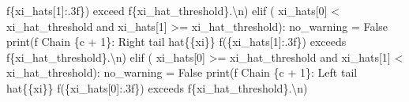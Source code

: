 \documentclass[
  letterpaper,
  DIV=11,
  numbers=noendperiod]{scrartcl}
\newenvironment{Shaded}{\begin{snugshade}}{\end{snugshade}}
\newcommand{\BuiltInTok}[1]{\textcolor[rgb]{0.00,0.23,0.31}{#1}}
\newcommand{\CharTok}[1]{\textcolor[rgb]{0.13,0.47,0.30}{#1}}
\newcommand{\ControlFlowTok}[1]{\textcolor[rgb]{0.00,0.23,0.31}{#1}}
\newcommand{\DecValTok}[1]{\textcolor[rgb]{0.68,0.00,0.00}{#1}}
\newcommand{\KeywordTok}[1]{\textcolor[rgb]{0.00,0.23,0.31}{#1}}
\newcommand{\NormalTok}[1]{\textcolor[rgb]{0.00,0.23,0.31}{#1}}
\newcommand{\OperatorTok}[1]{\textcolor[rgb]{0.37,0.37,0.37}{#1}}
\newcommand{\SpecialCharTok}[1]{\textcolor[rgb]{0.37,0.37,0.37}{#1}}
\newcommand{\SpecialStringTok}[1]{\textcolor[rgb]{0.13,0.47,0.30}{#1}}
\newcommand{\VariableTok}[1]{\textcolor[rgb]{0.07,0.07,0.07}{#1}}
\begin{document}
\begin{Shaded}
\begin{Highlighting}[]
            \SpecialStringTok{f\textquotesingle{}}\SpecialCharTok{\{}\NormalTok{xi\_hats[}\DecValTok{1}\NormalTok{]}\SpecialCharTok{:.3f\}}\SpecialStringTok{) exceed \textquotesingle{}}
            \SpecialStringTok{f\textquotesingle{}}\SpecialCharTok{\{}\NormalTok{xi\_hat\_threshold}\SpecialCharTok{\}}\SpecialStringTok{.}\CharTok{\textbackslash{}n}\SpecialStringTok{\textquotesingle{}}\NormalTok{)}
    \ControlFlowTok{elif}\NormalTok{ (    xi\_hats[}\DecValTok{0}\NormalTok{] }\OperatorTok{\textless{}}\NormalTok{ xi\_hat\_threshold}
          \KeywordTok{and}\NormalTok{ xi\_hats[}\DecValTok{1}\NormalTok{] }\OperatorTok{\textgreater{}=}\NormalTok{ xi\_hat\_threshold):}
\NormalTok{      no\_warning }\OperatorTok{=} \VariableTok{False}
      \BuiltInTok{print}\NormalTok{(}\SpecialStringTok{f\textquotesingle{}  Chain }\SpecialCharTok{\{}\NormalTok{c }\OperatorTok{+} \DecValTok{1}\SpecialCharTok{\}}\SpecialStringTok{: Right tail hat}\CharTok{\{\{}\SpecialStringTok{xi}\CharTok{\}\}}\SpecialStringTok{ \textquotesingle{}}
            \SpecialStringTok{f\textquotesingle{}(}\SpecialCharTok{\{}\NormalTok{xi\_hats[}\DecValTok{1}\NormalTok{]}\SpecialCharTok{:.3f\}}\SpecialStringTok{) exceeds \textquotesingle{}}
            \SpecialStringTok{f\textquotesingle{}}\SpecialCharTok{\{}\NormalTok{xi\_hat\_threshold}\SpecialCharTok{\}}\SpecialStringTok{.}\CharTok{\textbackslash{}n}\SpecialStringTok{\textquotesingle{}}\NormalTok{)}
    \ControlFlowTok{elif}\NormalTok{ (    xi\_hats[}\DecValTok{0}\NormalTok{] }\OperatorTok{\textgreater{}=}\NormalTok{ xi\_hat\_threshold}
          \KeywordTok{and}\NormalTok{ xi\_hats[}\DecValTok{1}\NormalTok{] }\OperatorTok{\textless{}}\NormalTok{ xi\_hat\_threshold):}
\NormalTok{      no\_warning }\OperatorTok{=} \VariableTok{False}
      \BuiltInTok{print}\NormalTok{(}\SpecialStringTok{f\textquotesingle{}  Chain }\SpecialCharTok{\{}\NormalTok{c }\OperatorTok{+} \DecValTok{1}\SpecialCharTok{\}}\SpecialStringTok{: Left tail hat}\CharTok{\{\{}\SpecialStringTok{xi}\CharTok{\}\}}\SpecialStringTok{ \textquotesingle{}}
            \SpecialStringTok{f\textquotesingle{}(}\SpecialCharTok{\{}\NormalTok{xi\_hats[}\DecValTok{0}\NormalTok{]}\SpecialCharTok{:.3f\}}\SpecialStringTok{) exceeds \textquotesingle{}}
            \SpecialStringTok{f\textquotesingle{}}\SpecialCharTok{\{}\NormalTok{xi\_hat\_threshold}\SpecialCharTok{\}}\SpecialStringTok{.}\CharTok{\textbackslash{}n}\SpecialStringTok{\textquotesingle{}}\NormalTok{)}


\end{Highlighting}
\end{Shaded}
\end{document}
